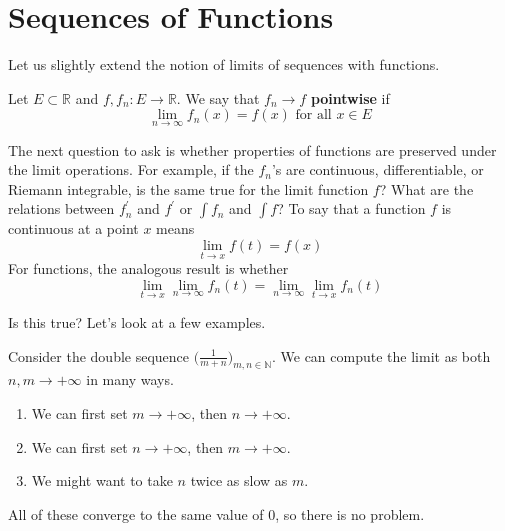\section{Sequences of Functions}

  Let us slightly extend the notion of limits of sequences with functions. 

  \begin{definition}
    Let $E \subset \mathbb{R}$ and $f, f_n : E \to \mathbb{R}$. We say that $f_n \to f$ \textbf{pointwise} if 
    \begin{equation}
      \lim_{n \to \infty} f_n (x) = f(x) \text{ for all } x \in E
    \end{equation}
  \end{definition}

  The next question to ask is whether properties of functions are preserved under the limit operations. For example, if the $f_n$'s are continuous, differentiable, or Riemann integrable, is the same true for the limit function $f$? What are the relations between $f_n^\prime$ and $f^\prime$ or $\int f_n$ and $\int f$? To say that a function $f$ is continuous at a point $x$ means 
  \begin{equation}
    \lim_{t \to x} f(t) = f(x)
  \end{equation}
  For functions, the analogous result is whether 
  \begin{equation}
    \lim_{t \to x} \lim_{n \to \infty} f_n (t) = \lim_{n \to \infty} \lim_{t \to x} f_n (t)
  \end{equation}

  Is this true? Let's look at a few examples. 

  \begin{example}
    Consider the double sequence $\big( \frac{1}{m + n} \big)_{m, n \in \mathbb{N}}$. We can compute the limit as both $n, m \to +\infty$ in many ways. 
    \begin{enumerate}
      \item We can first set $m \to +\infty$, then $n \to +\infty$. 
      \item We can first set $n \to +\infty$, then $m \to +\infty$. 
      \item We might want to take $n$ twice as slow as $m$. 
    \end{enumerate}
    All of these converge to the same value of $0$, so there is no problem. 
  \end{example}

